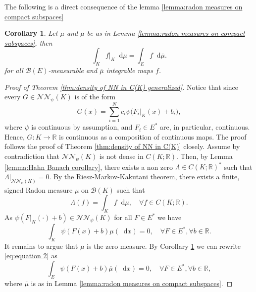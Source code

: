 \documentclass[11pt,a4paper,twoside,openany]{report}
\numberwithin{equation}{section}
\newcommand{\diff}{\mathop{}\!\mathrm{d}}
\theoremstyle{plain} %
\newtheorem{corollary}[theorem]{Corollary}
\theoremstyle{definition} %
\theoremstyle{remark} %
\begin{document}
The following is a direct consequence of the lemma \ref{lemma:radon measures on compact subspaces}
\begin{corollary}\label{cor:discriminatory property extends also true for subspace}
 Let \(\mu\) and \(\overline{\mu}\) be as in Lemma \ref{lemma:radon measures on compact subspaces}, then 
 \begin{equation*}
     \int_K f|_K\diff \mu=\int_E f\diff \overline{\mu}.
 \end{equation*}
 for all \(\mathcal{B}(E)\)-measurable and \(\overline{\mu}\) integrable maps \(f\).
\end{corollary}
\begin{proof}[Proof of Theorem \ref{thm:density of NN in C(K) generalized}]
Notice that since every \(G\in\mathcal{NN}_{\psi}(K)\) is of the form 
    \begin{equation*}
        G(x) =\sum_{i=1}^Nc_i\psi\big(F_i|_K(x)+b_i\big),
    \end{equation*}
    where \(\psi\) is continuous by assumption, and \(F_i\in E^*\) are, in particular, continuous. Hence, \(G:K\to\mathbb{R}\) is continuous as a composition of continuous maps. The proof follows the proof of Theorem \ref{thm:density of NN in C(K)} closely. Assume by contradiction that \(\mathcal{NN}_{\psi}(K)\) is not dense in \(C(K;\mathbb{R})\). Then, by Lemma \ref{lemma:Hahn Banach corollary}, there exists a non zero \(\Lambda\in C(K;\mathbb{R})^*\) such that \(\Lambda|_{\mathcal{NN}_{\psi}(K)}=0\). By the Riesz-Markov-Kakutani theorem, there exists a finite, signed Radon measure \(\mu\) on \(\mathcal{B}(K)\) such that 
    \begin{equation*}
    \Lambda(f)=\int_Kf\diff \mu,\quad\forall f\in C(K;\mathbb{R}).
    \end{equation*}
As \(\psi(F|_K(\cdot)+b)\in\mathcal{NN}_{\psi}(K)\) for all \(F\in E^*\) we have
\begin{equation}\label{eq:equation 2}
    \int_K\psi(F(x)+b)\mu(\diff x)=0,\quad\forall F\in E^*,\forall b\in\mathbb{R}.
\end{equation}
It remains to argue that \(\mu\) is the zero measure. By Corollary \ref{cor:discriminatory property extends also true for subspace} we can rewrite \eqref{eq:equation 2} as 
\begin{equation}\label{eq:equation 3}
    \int_{E}\psi(F(x)+b)\overline{\mu}(\diff x)=0,\quad\forall F\in E^*,\forall b\in\mathbb{R},
\end{equation}
where \(\overline{\mu}\) is as in Lemma \ref{lemma:radon measures on compact subspaces}.

\end{proof}
\end{document}
